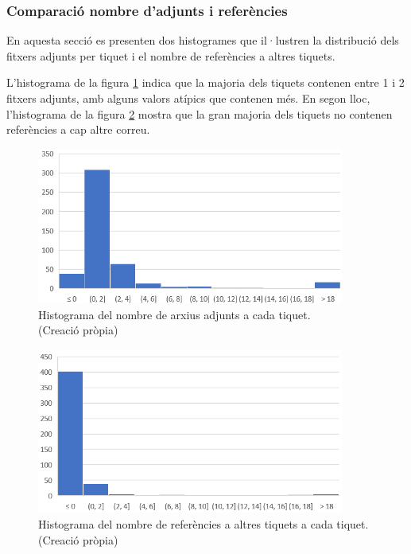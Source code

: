 \subsubsection{Comparació nombre d'adjunts i referències}
En aquesta secció es presenten dos histogrames que il·lustren la distribució dels fitxers adjunts per tiquet i el nombre de referències a altres tiquets.

L'histograma de la figura \ref{fig:histograma_num_adj} indica que la majoria dels tiquets contenen entre 1 i 2 fitxers adjunts, amb alguns valors atípics que contenen més. En segon lloc, l'histograma de la figura \ref{fig:histograma_num_refs} mostra que la gran majoria dels tiquets no contenen referències a cap altre correu. 

\begin{figure}[H]
    \centering
    \includegraphics[width=0.9\textwidth]{histograma_num_adj.png}
    \caption[Histograma del nombre d'adjunts a cada tiquet]{Histograma del nombre de arxius adjunts a cada tiquet. \\ (Creació pròpia)}
    \label{fig:histograma_num_adj}
\end{figure}


\begin{figure}[H]
    \centering
    \includegraphics[width=0.9\textwidth]{histograma_num_refs.png}
    \caption[Histograma del nombre de referències a cada tiquet]{Histograma del nombre de referències a altres tiquets a cada tiquet. \\ (Creació pròpia)}
    \label{fig:histograma_num_refs}
\end{figure}

